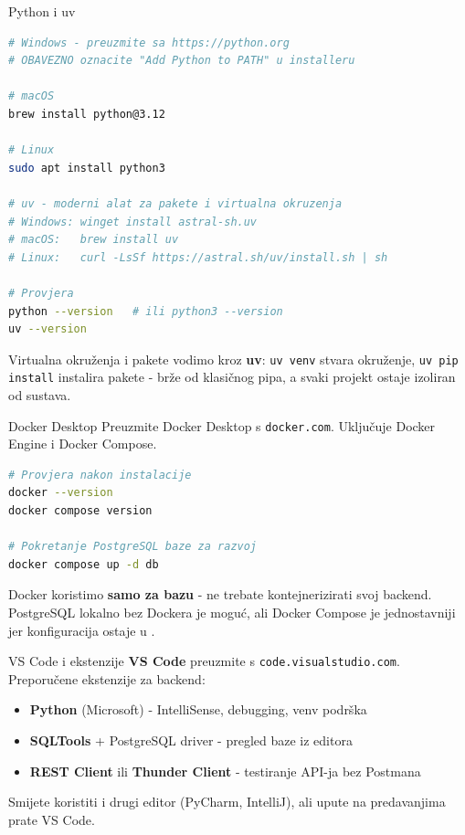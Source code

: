 \begin{frame}[fragile,shrink=5]{Python i uv}
\begin{lstlisting}[language=bash]
# Windows - preuzmite sa https://python.org
# OBAVEZNO oznacite "Add Python to PATH" u installeru

# macOS
brew install python@3.12

# Linux
sudo apt install python3

# uv - moderni alat za pakete i virtualna okruzenja
# Windows: winget install astral-sh.uv
# macOS:   brew install uv
# Linux:   curl -LsSf https://astral.sh/uv/install.sh | sh

# Provjera
python --version   # ili python3 --version
uv --version
\end{lstlisting}

\vspace{0.4em}
Virtualna okruženja i pakete vodimo kroz \textbf{uv}: \texttt{uv venv} stvara okruženje, \texttt{uv pip install} instalira pakete - brže od klasičnog pipa, a svaki projekt ostaje izoliran od sustava.
\end{frame}

\begin{frame}[fragile,shrink=5]{Docker Desktop}
Preuzmite Docker Desktop s \texttt{docker.com}. Uključuje Docker Engine i Docker Compose.

\begin{lstlisting}[language=bash]
# Provjera nakon instalacije
docker --version
docker compose version

# Pokretanje PostgreSQL baze za razvoj
docker compose up -d db
\end{lstlisting}

\vspace{0.4em}
Docker koristimo \textbf{samo za bazu} - ne trebate kontejnerizirati svoj backend. PostgreSQL lokalno bez Dockera je moguć, ali Docker Compose je jednostavniji jer konfiguracija ostaje u .
\end{frame}

\begin{frame}{VS Code i ekstenzije}
\textbf{VS Code} preuzmite s \texttt{code.visualstudio.com}. Preporučene ekstenzije za backend:

\vspace{0.4em}
\begin{itemize}
  \item \textbf{Python} (Microsoft) - IntelliSense, debugging, venv podrška
  \item \textbf{SQLTools} + PostgreSQL driver - pregled baze iz editora
  \item \textbf{REST Client} ili \textbf{Thunder Client} - testiranje API-ja bez Postmana
\end{itemize}

\vspace{0.6em}
Smijete koristiti i drugi editor (PyCharm, IntelliJ), ali upute na predavanjima prate VS Code.
\end{frame}

